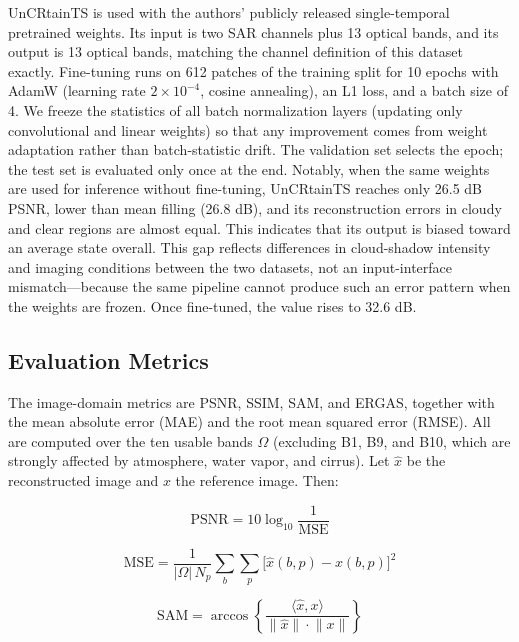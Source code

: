 \documentclass[a4paper,fleqn]{cas-dc}
\begin{document}
UnCRtainTS is used with the authors' publicly released single-temporal pretrained weights. Its input is two SAR channels plus 13 optical bands, and its output is 13 optical bands, matching the channel definition of this dataset exactly. Fine-tuning runs on 612 patches of the training split for 10 epochs with AdamW (learning rate $2\times10^{-4}$, cosine annealing), an L1 loss, and a batch size of 4. We freeze the statistics of all batch normalization layers (updating only convolutional and linear weights) so that any improvement comes from weight adaptation rather than batch-statistic drift. The validation set selects the epoch; the test set is evaluated only once at the end. Notably, when the same weights are used for inference without fine-tuning, UnCRtainTS reaches only 26.5 dB PSNR, lower than mean filling (26.8 dB), and its reconstruction errors in cloudy and clear regions are almost equal. This indicates that its output is biased toward an average state overall. This gap reflects differences in cloud-shadow intensity and imaging conditions between the two datasets, not an input-interface mismatch---because the same pipeline cannot produce such an error pattern when the weights are frozen. Once fine-tuned, the value rises to 32.6 dB.

\subsection{Evaluation Metrics}

The image-domain metrics are PSNR, SSIM, SAM, and ERGAS, together with the mean absolute error (MAE) and the root mean squared error (RMSE). All are computed over the ten usable bands $\Omega$ (excluding B1, B9, and B10, which are strongly affected by atmosphere, water vapor, and cirrus). Let $\hat{x}$ be the reconstructed image and $x$ the reference image. Then:

\begin{equation*}
\mathrm{PSNR}=10\log_{10}\frac{1}{\mathrm{MSE}}
\end{equation*}

\begin{equation}
\mathrm{MSE}=\frac{1}{|\Omega|\,N_{p}}\sum_{b}\sum_{p}
\bigl[\hat{x}(b,p)-x(b,p)\bigr]^{2}
\label{eq:mse}
\end{equation}

\begin{equation}
\mathrm{SAM}=\arccos\!\left\{
\frac{\langle\hat{x},x\rangle}{\lVert\hat{x}\rVert\cdot\lVert x\rVert}
\right\}
\label{eq:sam}
\end{equation}
\end{document}
